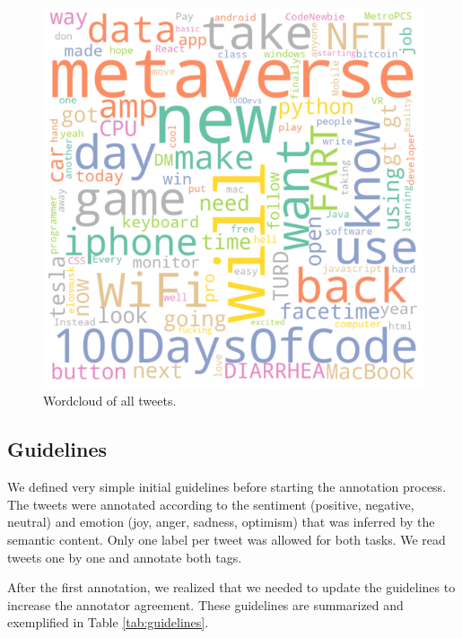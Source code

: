 \documentclass[11pt,a4paper]{article}
\begin{document}
\begin{figure}[ht]
    \centering
    \includegraphics[width=\linewidth]{wordcloud.png}
    \caption{Wordcloud of all tweets.}
    \label{fig:wordcloud}
\end{figure}

\subsection{Guidelines}

We defined very simple initial guidelines before starting the annotation process. The tweets were annotated according to the sentiment (positive, negative, neutral) and emotion (joy, anger, sadness, optimism) that was inferred by the semantic content. Only one label per tweet was allowed for both tasks. We read tweets one by one and annotate both tags.

After the first annotation, we realized that we needed to update the guidelines to increase the annotator agreement. These guidelines are summarized and exemplified in Table \ref{tab:guidelines}.
\end{document}
